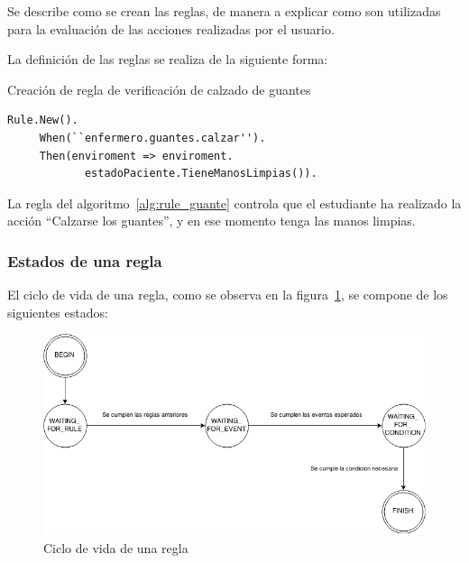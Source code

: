 Se describe como se crean las reglas, de manera a explicar como son utilizadas
para la evaluación de las acciones realizadas por el usuario.

La definición de las reglas se realiza de la siguiente forma:

\begin{algorithm}[H]
\caption{Creación de regla de verificación de calzado de guantes}
\label{alg:rule_guante}
\lstset{style=sharpc}
\begin{lstlisting}
Rule.New().
     When(``enfermero.guantes.calzar'').
     Then(enviroment => enviroment.
            estadoPaciente.TieneManosLimpias()).
\end{lstlisting}
\end{algorithm}

La regla del algoritmo~\ref{alg:rule_guante} controla que el estudiante ha
realizado la acción \enquote{Calzarse los guantes}, y en ese momento tenga las
manos limpias.

\subsubsection{Estados de una regla}

El ciclo de vida de una regla, como se observa en la figura~\ref{fig:rule_flow},
se compone de los siguientes estados:

\begin{figure}
\centering
\includegraphics[width=12cm]{solucion/images/rules_flow.png}
\caption{Ciclo de vida de una regla}
\label{fig:rule_flow}
\end{figure}

